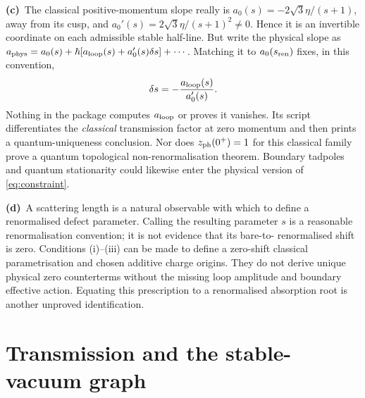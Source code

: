 \documentclass[11pt,a4paper]{article}
\newcommand{\Lc}{\textbf{(c)}\ }
\newcommand{\Ld}{\textbf{(d)}\ }
\begin{document}
\Lc The classical positive-momentum slope really is
$a_0(s)=-2\sqrt3\eta/(s+1)$, away from its cusp, and
$a_0'(s)=2\sqrt3\eta/(s+1)^2\ne0$. Hence it is an invertible coordinate
on each admissible stable half-line. But write the physical slope as
$a_{\rm phys}=a_0(s)+\hbar[a_{\rm loop}(s)+a_0'(s)\delta s]+\cdots$.
Matching it to $a_0(s_{\rm ren})$ fixes, in this convention,
\begin{equation}
 \delta s=-\frac{a_{\rm loop}(s)}{a_0'(s)}.
\end{equation}
Nothing in the package computes $a_{\rm loop}$ or proves it vanishes.
Its script differentiates the \emph{classical} transmission factor at zero
momentum and then prints a quantum-uniqueness conclusion. Nor does
$z_{\rm ph}(0^+)=1$ for this classical family prove a quantum topological
non-renormalisation theorem. Boundary tadpoles and quantum stationarity
could likewise enter the physical version of \eqref{eq:constraint}.

\Ld A scattering length is a natural observable with which to define a
renormalised defect parameter. Calling the resulting parameter $s$ is a
reasonable renormalisation convention; it is not evidence that its bare-to-
renormalised shift is zero. Conditions (i)--(iii) can be made to define a
zero-shift classical parametrisation and chosen additive charge origins.
They do not derive unique physical zero counterterms without the missing
loop amplitude and boundary effective action. Equating this prescription
to a renormalised absorption root is another unproved identification.

\section{Transmission and the stable-vacuum graph}
\end{document}
